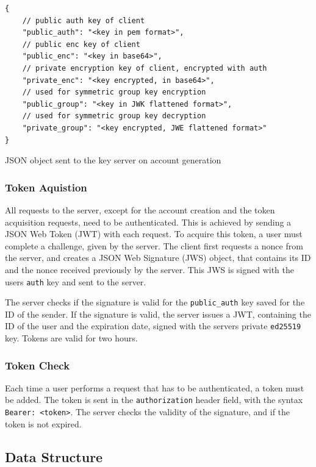 \documentclass[a4paper, oneside]{discothesis}
\begin{document}
\begin{listing}[h!]
\begin{verbatim}
{
    // public auth key of client
    "public_auth": "<key in pem format>",
    // public enc key of client
    "public_enc": "<key in base64>",
    // private encryption key of client, encrypted with auth
    "private_enc": "<key encrypted, in base64>",
    // used for symmetric group key encryption
    "public_group": "<key in JWK flattened format>",
    // used for symmetric group key decryption
    "private_group": "<key encrypted, JWE flattened format>" 
}
\end{verbatim}
\caption{JSON object sent to the key server on account generation}
\label{lst:new_account}
\end{listing}

\subsubsection{Token Aquistion}

All requests to the server, except for the account creation and the token acquisition requests, need to be authenticated. This is achieved by sending a JSON Web Token (JWT) with each request. To acquire this token, a user must complete a challenge, given by the server. The client first requests a nonce from the server, and creates a JSON Web Signature (JWS) object, that contains its ID and the nonce received previously by the server. This JWS is signed with the users \texttt{auth} key and sent to the server.

The server checks if the signature is valid for the \texttt{public\_auth} key saved for the ID of the sender. If the signature is valid, the server issues a JWT, containing the ID of the user and the expiration date, signed with the servers private \texttt{ed25519} key. Tokens are valid for two hours.

\subsubsection{Token Check}

Each time a user performs a request that has to be authenticated, a token must be added. The token is sent in the \texttt{authorization} header field, with the syntax \texttt{Bearer: <token>}. The server checks the validity of the signature, and if the token is not expired.

\subsection{Data Structure}
\end{document}
